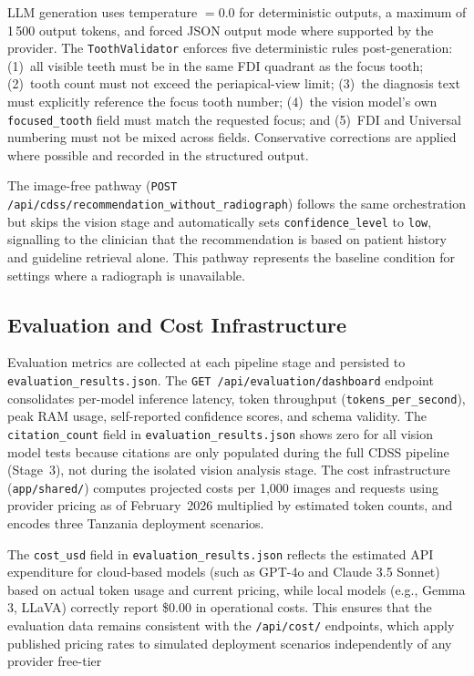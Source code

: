 \documentclass[12pt,a4paper]{report}
\begin{document}
LLM generation uses temperature $= 0.0$ for deterministic outputs, a
maximum of 1\,500 output tokens, and forced JSON output mode where
supported by the provider.  The \texttt{ToothValidator} enforces five
deterministic rules post-generation: (1)~all visible teeth must be in
the same FDI quadrant as the focus tooth; (2)~tooth count must not
exceed the periapical-view limit; (3)~the diagnosis text must
explicitly reference the focus tooth number; (4)~the vision model's
own \texttt{focused\_tooth} field must match the requested focus; and
(5)~FDI and Universal numbering must not be mixed across fields.
Conservative corrections are applied where possible and recorded in the
structured output.

The image-free pathway
(\texttt{POST /api/cdss/recommendation\_without\_radiograph}) follows
the same orchestration but skips the vision stage and automatically sets
\texttt{confidence\_level} to \texttt{low}, signalling to the clinician
that the recommendation is based on patient history and guideline
retrieval alone.  This pathway represents the baseline condition for
settings where a radiograph is unavailable.


     \subsection{Evaluation and Cost Infrastructure}
     \label{subsec:eval_infra}
    
     Evaluation metrics are collected at each pipeline stage and persisted
     to \texttt{evaluation\_results.json}. The
     \texttt{GET /api/evaluation/dashboard} endpoint consolidates per-model
     inference latency, token throughput (\texttt{tokens\_per\_second}), peak RAM
     usage,
     self-reported confidence scores, and schema validity. The
     \texttt{citation\_count}
     field in \texttt{evaluation\_results.json} shows zero for all vision model tests
    because citations are only populated during the full CDSS pipeline
    (Stage~3), not during the isolated vision analysis stage. The cost
    infrastructure (\texttt{app/shared/}) computes projected costs per 1,000 images
    and requests using provider pricing as of February~2026 multiplied by
    estimated token counts, and encodes three Tanzania deployment scenarios.
   
    The \texttt{cost\_usd} field in \texttt{evaluation\_results.json} reflects
    the estimated API expenditure for cloud-based models (such as GPT-4o and
    Claude 3.5 Sonnet) based on actual token usage and current pricing, while
    local models (e.g., Gemma 3, LLaVA) correctly report \$0.00 in operational
    costs. This ensures that the evaluation data remains consistent with the
    \texttt{/api/cost/} endpoints, which apply published pricing rates to
    simulated deployment scenarios independently of any provider free-tier
\end{document}
